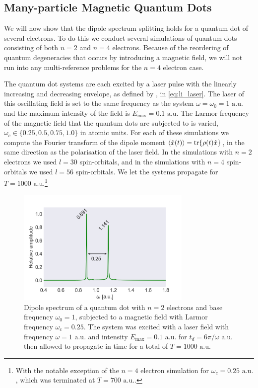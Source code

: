 \subsection{Many-particle Magnetic Quantum Dots}

We will now show that the dipole spectrum splitting holds for a quantum dot of 
several electrons. To do this we conduct several simulations of quantum dots consisting 
of both $n=2$ and $n=4$ electrons. Because of the reordering of quantum degeneracies 
that occurs by introducing a magnetic field, we will not run into any multi-reference 
problems for the $n=4$ electron case.

The quantum dot systems are each excited by a laser pulse with the linearly increasing 
and decreasing envelope, as defined by \citeauthor{li2005time} \cite{li2005time}, in 
\autoref{eq:li_laser}. The laser of this oscillating field is set to the 
same frequency as the system $\omega=\omega_0=1 \text{ a.u.}$ and the maximum intensity of the field 
is $E_\text{max} = 0.1 \text{ a.u.}$ The Larmor frequency of the magnetic field that the 
quantum dots are subjected to is varied, $\omega_c\in\{0.25, 0.5, 0.75, 1.0\}$
in atomic units.
For each of these simulations we compute the Fourier transform of the dipole moment
$\ev{\hat{x}(t)} =\tr{\rho(t) \hat{x}}$, in 
the same direction as the polarisation of the laser field.
In the simulations with $n=2$ electrons we used $l=30$ spin-orbitals,
and in the simulations with $n=4$ spin-orbitals we used $l=56$ spin-orbitals.
We let the systems propagate for $T = 1000 \text{ a.u.}$\footnote{With the notable 
exception of the $n=4$ electron simulation for $\omega_c=0.25 \text{ a.u.}$, which was terminated 
at $T=700 \text{ a.u.}$.}

\begin{figure}
    \centering
    \includegraphics[width=0.75\textwidth]
        {results/figures/B_field/n=2/b_spectrum_omc025.png}
    \caption{Dipole spectrum of a quantum dot with $n=2$ electrons and base frequency 
        $\omega_0 = 1$,
        subjected to a magnetic field with Larmor frequency $\omega_c=0.25$. The 
        system was excited with a laser field with frequency $\omega = 1 \text{ a.u.}$ 
        and intensity $E_\text{max} = 0.1 \text{ a.u.}$ for $t_d = 6\pi/\omega \text{ a.u.}$ then 
        allowed to propagate in time for a total of $T=1000 \text{ a.u.}$} 
    \label{fig:b_n2_omc025}
\end{figure}

